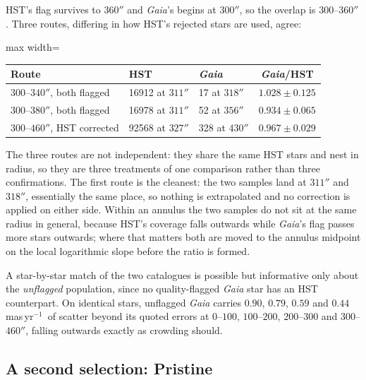 \documentclass[11pt,a4paper]{article}
\newcommand{\masyr}{mas\,yr$^{-1}$}
\begin{document}
HST's flag survives to $360''$ and \emph{Gaia}'s begins at $300''$, so the overlap is
$300$--$360''$. Three routes, differing in how HST's rejected stars are used, agree:

\begin{table}[h]
\centering\small
\begin{adjustbox}{max width=\linewidth}
\begin{tabular}{lllc}
\toprule
Route & HST & \emph{Gaia} & \emph{Gaia}/HST \\
\midrule
$300$--$340''$, both flagged & 16912 at $311''$ & 17 at $318''$ & $1.028\pm0.125$ \\
$300$--$380''$, both flagged & 16978 at $311''$ & 52 at $356''$ & $0.934\pm0.065$ \\
$300$--$460''$, HST corrected & 92568 at $327''$ & 328 at $430''$ & $0.967\pm0.029$ \\
\bottomrule
\end{tabular}
\end{adjustbox}
\end{table}

The three routes are not independent: they share the same HST stars and nest in radius, so
they are three treatments of one comparison rather than three confirmations. The first route
is the cleanest: the two samples land at $311''$ and $318''$, essentially the
same place, so nothing is extrapolated and no correction is applied on either side. Within an
annulus the two samples do not sit at the same radius in general, because HST's coverage
falls outwards while \emph{Gaia}'s flag passes more stars outwards; where that matters both
are moved to the annulus midpoint on the local logarithmic slope before the ratio is formed.

A star-by-star match of the two catalogues is possible but informative only about the
\emph{unflagged} population, since no quality-flagged \emph{Gaia} star has an HST
counterpart. On identical stars, unflagged \emph{Gaia} carries $0.90$, $0.79$, $0.59$ and
$0.44$\,\masyr\ of scatter beyond its quoted errors at $0$--$100$, $100$--$200$, $200$--$300$
and $300$--$460''$, falling outwards exactly as crowding should.

\subsection{A second selection: Pristine}
\end{document}
